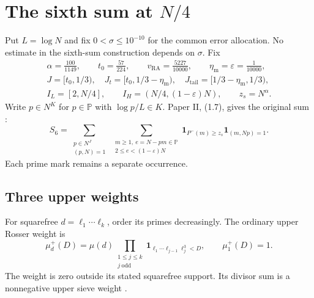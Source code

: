 \section{\texorpdfstring{The sixth sum at \(N/4\)}{The sixth sum at N/4}}\label{sec:root-a}

Put \(L=\log N\) and fix \(0<\sigma\le10^{-10}\) for the common
error allocation. No estimate in the sixth-sum construction depends on \(\sigma\). Fix
\begin{equation}\label{eq:ra-parameters}
\begin{gathered}
 \alpha=\frac{100}{1149},\qquad t_0=\frac{57}{224},\qquad
 v_{\mathrm{RA}}=\frac{5227}{10000},\qquad \eta_{\mathrm m}=\varepsilon=\frac1{10000},\\
 J=[t_0,1/3),\quad J_t=[t_0,1/3-\eta_{\mathrm m}),\quad
 J_{\mathrm{tail}}=[1/3-\eta_{\mathrm m},1/3),\\
 I_L=[2,N/4],\qquad I_H=(N/4,(1-\varepsilon)N),\qquad z_s=N^\alpha.
\end{gathered}
\end{equation}
Write \(p\in N^K\) for \(p\in\mathbb P\) with \(\log p/L\in K\).
Paper II, (1.7), gives the original sum \cite[(1.7)]{PaperII}:
\begin{equation}\label{eq:ra-original-s6}
 S_6=\sum_{\substack{p\in N^J\\(p,N)=1}}
 \ \sum_{\substack{m\ge1,\ e=N-pm\in\mathbb P\\2\le e<(1-\varepsilon)N}}
 \mathbf1_{P^-(m)\ge z_s}\mathbf1_{(m,Np)=1}.
\end{equation}
Each prime mark remains a separate occurrence.

\subsection{Three upper weights}

For squarefree \(d=\ell_1\cdots\ell_k\), order its primes decreasingly.
The ordinary upper Rosser weight is
\begin{equation}\label{eq:ra-rosser-weight}
 \mu_d^+(D)=\mu(d)
 \prod_{\substack{1\le j\le k\\j\ \mathrm{odd}}}
 \mathbf1_{\ell_1\cdots\ell_{j-1}\ell_j^3<D},
 \qquad \mu_1^+(D)=1.
\end{equation}
The weight is zero outside its stated squarefree support.
Its divisor sum is a nonnegative upper sieve weight
\cite[Lemma 1, (3.2), (3.6)]{Iwaniec1980Rosser}
\cite[Lemmas 2--3, p.~313]{Iwaniec1980Remainder}.

